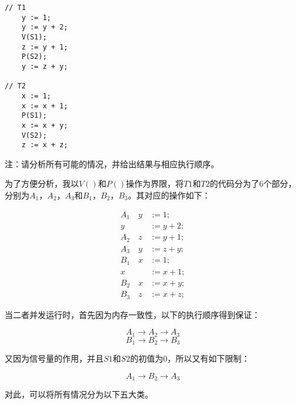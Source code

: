 
\begin{lstlisting}
// T1
    y := 1;
    y := y + 2;
    V(S1);
    z := y + 1;
    P(S2);
    y := z + y;

// T2
    x := 1;
    x := x + 1;
    P(S1);
    x := x + y;
    V(S2);
    z := x + z;
\end{lstlisting}

注：请分析所有可能的情况，并给出结果与相应执行顺序。

\begin{solution}

为了方便分析，我以$V()$和$P()$操作为界限，将$T1$和$T2$的代码分为了$6$个部分，分别为$A_1$，$A_2$，$A_3$和$B_1$，$B_2$，$B_3$。其对应的操作如下：

$$
\begin{aligned}
    A_1 \quad y & := 1; \\
              y & := y + 2; \\
    A_2 \quad z & := y + 1; \\
    A_3 \quad y & := z + y; \\
    B_1 \quad x & := 1; \\
              x & := x + 1; \\
    B_2 \quad x & := x + y; \\
    B_3 \quad z & := x + z;
\end{aligned}
$$


当二者并发运行时，首先因为内存一致性，以下的执行顺序得到保证：

$$
A_1 \to A_2 \to A_3
$$
$$
B_1 \to B_2 \to B_3
$$

又因为信号量的作用，并且$S1$和$S2$的初值为$0$，所以又有如下限制：

$$
A_1 \to B_2 \to A_3
$$

对此，可以将所有情况分为以下五大类。

\end{solution}
